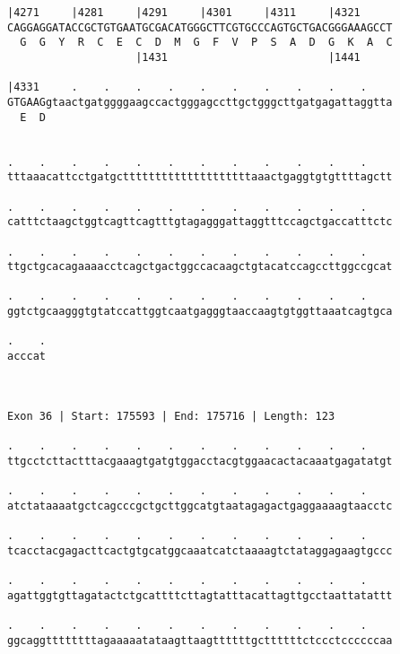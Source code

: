 \documentclass{article}
\begin{document}
\begin{Verbatim}
|4271     |4281     |4291     |4301     |4311     |4321     
CAGGAGGATACCGCTGTGAATGCGACATGGGCTTCGTGCCCAGTGCTGACGGGAAAGCCT
  G  G  Y  R  C  E  C  D  M  G  F  V  P  S  A  D  G  K  A  C
                    |1431                         |1441     
  
|4331     .    .    .    .    .    .    .    .    .    .    
GTGAAGgtaactgatggggaagccactgggagccttgctgggcttgatgagattaggtta
  E  D                                                      
                                                            
  
.    .    .    .    .    .    .    .    .    .    .    .    
tttaaacattcctgatgcttttttttttttttttttttaaactgaggtgtgttttagctt
                                                            
.    .    .    .    .    .    .    .    .    .    .    .    
catttctaagctggtcagttcagtttgtagagggattaggtttccagctgaccatttctc
                                                            
.    .    .    .    .    .    .    .    .    .    .    .    
ttgctgcacagaaaacctcagctgactggccacaagctgtacatccagccttggccgcat
                                                            
.    .    .    .    .    .    .    .    .    .    .    .    
ggtctgcaagggtgtatccattggtcaatgagggtaaccaagtgtggttaaatcagtgca
                                                            
.    .
acccat
      
      
 
Exon 36 | Start: 175593 | End: 175716 | Length: 123
 
.    .    .    .    .    .    .    .    .    .    .    .    
ttgcctcttactttacgaaagtgatgtggacctacgtggaacactacaaatgagatatgt
                                                            
.    .    .    .    .    .    .    .    .    .    .    .    
atctataaaatgctcagcccgctgcttggcatgtaatagagactgaggaaaagtaacctc
                                                            
.    .    .    .    .    .    .    .    .    .    .    .    
tcacctacgagacttcactgtgcatggcaaatcatctaaaagtctataggagaagtgccc
                                                            
.    .    .    .    .    .    .    .    .    .    .    .    
agattggtgttagatactctgcattttcttagtatttacattagttgcctaattatattt
                                                            
.    .    .    .    .    .    .    .    .    .    .    .    
ggcaggttttttttagaaaaatataagttaagttttttgcttttttctccctccccccaa
                                                            

\end{Verbatim}
\end{document}
